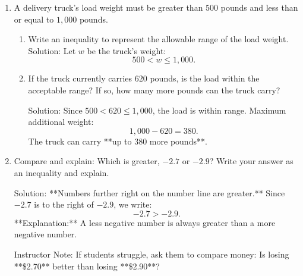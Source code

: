 \documentclass[12pt]{article}
\begin{document}
\begin{tcolorbox}[colframe=black!60, colback=white, 
coltitle=black, colbacktitle=black!15, fonttitle=\bfseries\Large, 
title=Problems (Part 2), halign title=center, left=10pt, right=10pt, top=10pt, bottom=40pt]
\begin{enumerate}[start=11, itemsep=5em]

    \item A delivery truck’s load weight must be greater than \( 500 \) pounds and less than or equal to \( 1,000 \) pounds.  
    \begin{enumerate}
        \item Write an inequality to represent the allowable range of the load weight.  
            {\color{red} Solution: Let \( w \) be the truck’s weight:
            \[
            500 < w \leq 1,000.
            \]}
        
        \item If the truck currently carries \( 620 \) pounds, is the load within the acceptable range? If so, how many more pounds can the truck carry?
        
            {\color{red} Solution: Since \( 500 < 620 \leq 1,000 \), the load is within range.  
            Maximum additional weight:
            \[
            1,000 - 620 = 380.
            \]
            The truck can carry **up to 380 more pounds**.}
    \end{enumerate}

    \item Compare and explain: Which is greater, \( -2.7 \) or \( -2.9 \)? Write your answer as an inequality and explain.

    {\color{red} Solution: **Numbers further right on the number line are greater.**  
    Since \( -2.7 \) is to the right of \( -2.9 \), we write:
    \[
    -2.7 > -2.9.
    \]
    **Explanation:** A less negative number is always greater than a more negative number.}
    
    {\color{blue} Instructor Note: If students struggle, ask them to compare money: Is losing **\$2.70** better than losing **\$2.90**?}
    
\end{enumerate}
\end{tcolorbox}
\end{document}
